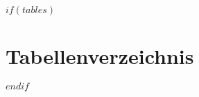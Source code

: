 \documentclass[%
	paper=A4,					%
	twoside=true,				%
	openright,					%
	parskip=full,				%
	chapterprefix=true,			%
	11pt,						%
	headings=normal,			%
	bibliography=totoc,			%
	listof=totoc,				%
	titlepage=on,				%
	captions=tableabove,		%
	draft=false,				%
    $if(lang)$$babel-lang$,$endif$
]{scrreprt}%
\begin{document}
\listoflistings%
\cleardoublepage

$if(tables)$
\chapter*{Tabellenverzeichnis}\label{tabellenverzeichnis}
\makeatletter
{}%
\makeatother
\cleardoublepage
$endif$

%


\cleardoublepage

\end{document}
